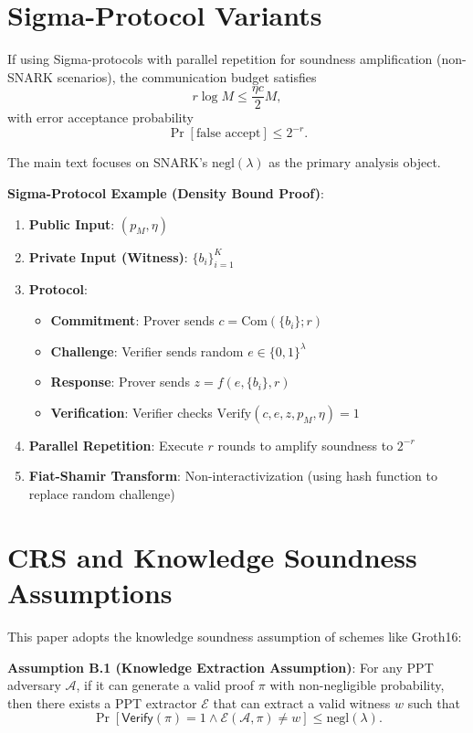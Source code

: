 \documentclass[12pt]{article}
\theoremstyle{plain}
\theoremstyle{definition}
\begin{document}
\appendix

\section{Sigma-Protocol Variants}

If using Sigma-protocols with parallel repetition for soundness amplification (non-SNARK scenarios), the communication budget satisfies
\[
r \log M \le \frac{\eta c}{2} M,
\]
with error acceptance probability
\[
\Pr[\text{false accept}] \le 2^{-r}.
\]

The main text focuses on SNARK's $\text{negl}(\lambda)$ as the primary analysis object.

\textbf{Sigma-Protocol Example (Density Bound Proof)}:

\begin{enumerate}
\item \textbf{Public Input}: $(p_M, \eta)$
\item \textbf{Private Input (Witness)}: $\{b_i\}_{i=1}^K$
\item \textbf{Protocol}:
\begin{itemize}
   \item \textbf{Commitment}: Prover sends $c = \text{Com}(\{b_i\}; r)$
   \item \textbf{Challenge}: Verifier sends random $e \in \{0,1\}^{\lambda}$
   \item \textbf{Response}: Prover sends $z = f(e, \{b_i\}, r)$
   \item \textbf{Verification}: Verifier checks $\text{Verify}(c, e, z, p_M, \eta) = 1$
\end{itemize}
\item \textbf{Parallel Repetition}: Execute $r$ rounds to amplify soundness to $2^{-r}$
\item \textbf{Fiat-Shamir Transform}: Non-interactivization (using hash function to replace random challenge)
\end{enumerate}

\section{CRS and Knowledge Soundness Assumptions}

This paper adopts the knowledge soundness assumption of schemes like Groth16:

\textbf{Assumption B.1 (Knowledge Extraction Assumption)}: For any PPT adversary $\mathcal{A}$, if it can generate a valid proof $\pi$ with non-negligible probability, then there exists a PPT extractor $\mathcal{E}$ that can extract a valid witness $w$ such that
\[
\Pr[\mathsf{Verify}(\pi) = 1 \wedge \mathcal{E}(\mathcal{A}, \pi) \ne w] \le \text{negl}(\lambda).
\]
\end{document}
